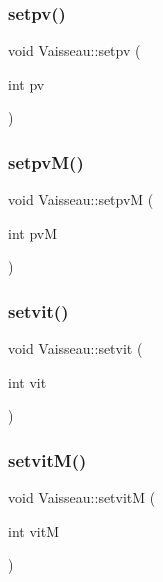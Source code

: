 \mbox{\label{class_vaisseau_a2c9cf0b0520a6bee6408af58e3c99e34}} 
\subsubsection{\texorpdfstring{setpv()}{setpv()}}
{\footnotesize\ttfamily void Vaisseau\+::setpv (\begin{DoxyParamCaption}\item[{int}]{pv }\end{DoxyParamCaption})}

\mbox{\label{class_vaisseau_a10a33c8fed1bb1530148e98313d80a87}} 
\subsubsection{\texorpdfstring{setpv\+M()}{setpvM()}}
{\footnotesize\ttfamily void Vaisseau\+::setpvM (\begin{DoxyParamCaption}\item[{int}]{pvM }\end{DoxyParamCaption})}

\mbox{\label{class_vaisseau_a86c2165e77892f03e8d08f1e509e9b10}} 
\subsubsection{\texorpdfstring{setvit()}{setvit()}}
{\footnotesize\ttfamily void Vaisseau\+::setvit (\begin{DoxyParamCaption}\item[{int}]{vit }\end{DoxyParamCaption})}

\mbox{\label{class_vaisseau_a5816b1761b1d6f12f2ee3077b938392a}} 
\subsubsection{\texorpdfstring{setvit\+M()}{setvitM()}}
{\footnotesize\ttfamily void Vaisseau\+::setvitM (\begin{DoxyParamCaption}\item[{int}]{vitM }\end{DoxyParamCaption})}



